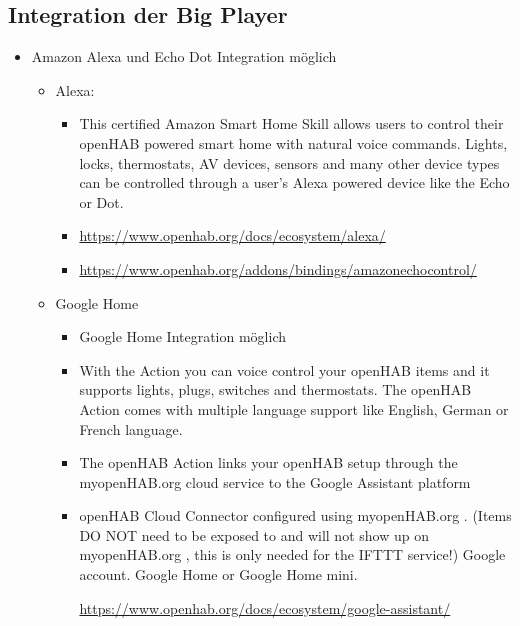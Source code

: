 \subsection{Integration der Big Player}
\begin{itemize}
	\item Amazon Alexa und Echo Dot Integration möglich
	\begin{itemize}
		\item Alexa:
		\begin{itemize}
			\item This certified Amazon Smart Home Skill allows users to control their openHAB powered smart home with natural voice commands. Lights, locks, thermostats, AV devices, sensors and many other device types can be controlled through a user's Alexa powered device like the Echo or Dot.
			\item \url{https://www.openhab.org/docs/ecosystem/alexa/}
			\item \url{https://www.openhab.org/addons/bindings/amazonechocontrol/}
		\end{itemize} 
		\item Google Home
		\begin{itemize}
			\item Google Home Integration möglich
			\item With the Action you can voice control your openHAB items and it supports lights, plugs, switches and thermostats. The openHAB Action comes with multiple language support like English, German or French language.
			\item The openHAB Action links your openHAB setup through the myopenHAB.org cloud service to the Google Assistant platform
			\item openHAB Cloud Connector configured using myopenHAB.org . (Items DO NOT need to be exposed to and will not show up on myopenHAB.org
			, this is only needed for the IFTTT service!)
			Google account.
			Google Home or Google Home mini.
			
			\url{https://www.openhab.org/docs/ecosystem/google-assistant/}
		\end{itemize} 
	\end{itemize}
	
\end{itemize}

